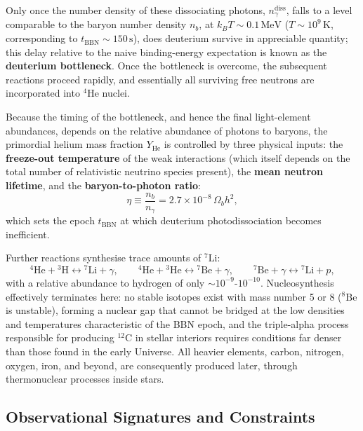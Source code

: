 \smallskip

Only once the number density of these dissociating photons, $n_\gamma^{\text{diss}}$, falls to a level comparable to the baryon number density $n_b$, at $k_BT \sim 0.1\,\text{MeV}$ ($T \sim 10^9\,\text{K}$, corresponding to $t_{\text{BBN}} \sim 150\,\text{s}$), does deuterium survive in appreciable quantity; this delay relative to the naive binding-energy expectation is known as the \textbf{deuterium bottleneck}. Once the bottleneck is overcome, the subsequent reactions proceed rapidly, and essentially all surviving free neutrons are incorporated into $^4\text{He}$ nuclei.

\medskip

Because the timing of the bottleneck, and hence the final light-element abundances, depends on the relative abundance of photons to baryons, the primordial helium mass fraction $Y_{\text{He}}$ is controlled by three physical inputs: the \textbf{freeze-out temperature} of the weak interactions (which itself depends on the total number of relativistic neutrino species present), the \textbf{mean neutron lifetime}, and the \textbf{baryon-to-photon ratio}:
$$
\eta \equiv \frac{n_b}{n_\gamma} = 2.7\times 10^{-8}\,\Omega_b h^2 ,
$$
which sets the epoch $t_{\text{BBN}}$ at which deuterium photodissociation becomes inefficient.

\medskip

Further reactions synthesise trace amounts of $^7\text{Li}$:
$$
{}^4\text{He} + {}^3\text{H} \leftrightarrow {}^7\text{Li} + \gamma , \qquad
{}^4\text{He} + {}^3\text{He} \leftrightarrow {}^7\text{Be} + \gamma , \qquad
{}^7\text{Be} + \gamma \leftrightarrow {}^7\text{Li} + p,
$$
with a relative abundance to hydrogen of only $\sim 10^{-9}$-$10^{-10}$. Nucleosynthesis effectively terminates here: no stable isotopes exist with mass number 5 or 8 ($^8\text{Be}$ is unstable), forming a nuclear gap that cannot be bridged at the low densities and temperatures characteristic of the BBN epoch, and the triple-alpha process responsible for producing $^{12}\text{C}$ in stellar interiors requires conditions far denser than those found in the early Universe. All heavier elements, carbon, nitrogen, oxygen, iron, and beyond, are consequently produced later, through thermonuclear processes inside stars.

\subsection{Observational Signatures and Constraints} \label{subsec:bbn_observations}

